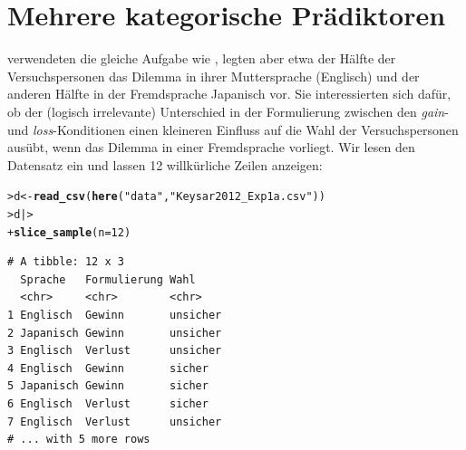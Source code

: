 \documentclass[oneside, 10pt]{book}\usepackage[]{graphicx}\usepackage[]{xcolor}
\makeatletter
\newcommand{\hlnum}[1]{\textcolor[rgb]{0.686,0.059,0.569}{#1}}%
\newcommand{\hlstr}[1]{\textcolor[rgb]{0.192,0.494,0.8}{#1}}%
\newcommand{\hlstd}[1]{\textcolor[rgb]{0.345,0.345,0.345}{#1}}%
\newcommand{\hlkwb}[1]{\textcolor[rgb]{0.69,0.353,0.396}{#1}}%
\newcommand{\hlkwc}[1]{\textcolor[rgb]{0.333,0.667,0.333}{#1}}%
\newcommand{\hlkwd}[1]{\textcolor[rgb]{0.737,0.353,0.396}{\textbf{#1}}}%
\newenvironment{kframe}{%
 \def\at@end@of@kframe{}%
 \ifinner\ifhmode%
  \def\at@end@of@kframe{\end{minipage}}%
  \begin{minipage}{\columnwidth}%
 \fi\fi%
 \def\FrameCommand##1{\hskip\@totalleftmargin \hskip-\fboxsep
 \colorbox{shadecolor}{##1}\hskip-\fboxsep
     \hskip-\linewidth \hskip-\@totalleftmargin \hskip\columnwidth}%
 \MakeFramed {\advance\hsize-\width
   \@totalleftmargin\z@ \linewidth\hsize
   \@setminipage}}%
 {\par\unskip\endMakeFramed%
 \at@end@of@kframe}
\newenvironment{knitrout}{}{} %
\makeatother
\begin{document}
\section{Mehrere kategorische Prädiktoren}



\citet[][Experiment 1a]{Keysar2012} verwendeten die gleiche Aufgabe
wie \citet{Tversky1981}, legten aber etwa der Hälfte
der Versuchspersonen das Dilemma in ihrer Muttersprache
(Englisch) und der anderen Hälfte in der Fremdsprache
Japanisch vor. Sie interessierten sich dafür, ob
der (logisch irrelevante) Unterschied in der Formulierung
zwischen den \textit{gain}- und \textit{loss}-Konditionen
einen kleineren Einfluss auf die Wahl der Versuchspersonen
ausübt, wenn das Dilemma in einer Fremdsprache vorliegt.
Wir lesen den Datensatz ein und lassen 12 willkürliche Zeilen
anzeigen:
\begin{knitrout}
\color{fgcolor}\begin{kframe}
\begin{alltt}
\hlstd{> }\hlstd{d} \hlkwb{<-} \hlkwd{read_csv}\hlstd{(}\hlkwd{here}\hlstd{(}\hlstr{"data"}\hlstd{,} \hlstr{"Keysar2012_Exp1a.csv"}\hlstd{))}
\hlstd{> }\hlstd{d |>}
\hlstd{+ }  \hlkwd{slice_sample}\hlstd{(}\hlkwc{n} \hlstd{=} \hlnum{12}\hlstd{)}
\end{alltt}
\begin{verbatim}
# A tibble: 12 x 3
  Sprache   Formulierung Wahl    
  <chr>     <chr>        <chr>   
1 Englisch  Gewinn       unsicher
2 Japanisch Gewinn       unsicher
3 Englisch  Verlust      unsicher
4 Englisch  Gewinn       sicher  
5 Japanisch Gewinn       sicher  
6 Englisch  Verlust      sicher  
7 Englisch  Verlust      unsicher
# ... with 5 more rows
\end{verbatim}
\end{kframe}
\end{knitrout}
\end{document}

